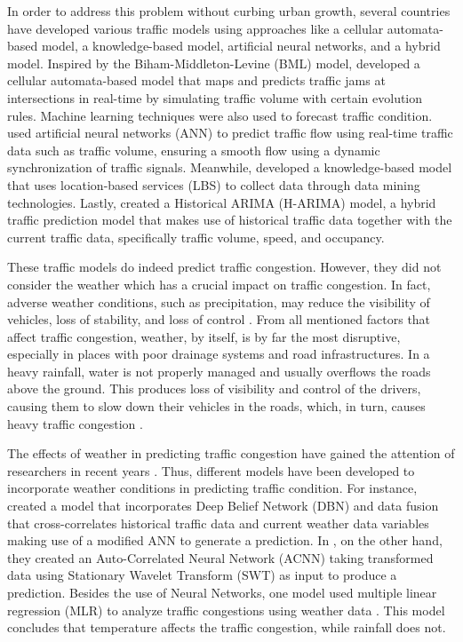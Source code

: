 In order to address this problem without curbing urban growth, several countries have developed various traffic models using approaches like a cellular automata-based model, a knowledge-based model, artificial neural networks, and a hybrid model. Inspired by the Biham-Middleton-Levine (BML) model,  developed a cellular automata-based model that maps and predicts traffic jams at intersections in real-time by simulating traffic volume with certain evolution rules. Machine learning techniques were also used to forecast traffic condition.  used artificial neural networks (ANN) to predict traffic flow using real-time traffic data such as traffic volume, ensuring a smooth flow using a dynamic synchronization of traffic signals. Meanwhile,  developed a knowledge-based model that uses location-based services (LBS) to collect data through data mining technologies. Lastly,  created a Historical ARIMA (H-ARIMA) model, a hybrid traffic prediction model that makes use of historical traffic data together with the current traffic data, specifically traffic volume, speed, and occupancy. 

These traffic models do indeed predict traffic congestion. However, they did not consider the weather which has a crucial impact on traffic congestion. In fact, adverse weather conditions, such as precipitation, may reduce the visibility of vehicles, loss of stability, and loss of control . From all mentioned factors that affect traffic congestion, weather, by itself, is by far the most disruptive, especially in places with poor drainage systems and road infrastructures. In a heavy rainfall, water is not properly managed and usually overflows the roads above the ground. This produces loss of visibility and control of the drivers, causing them to slow down their vehicles in the roads, which, in turn, causes heavy traffic congestion .

The effects of weather in predicting traffic congestion have gained the attention of researchers in recent years . Thus, different models have been developed to incorporate weather conditions in predicting traffic condition. For instance,  created a model that incorporates Deep Belief Network (DBN) and data fusion that cross-correlates historical traffic data and current weather data variables making use of a modified ANN to generate a prediction. In , on the other hand, they created an Auto-Correlated Neural Network (ACNN) taking transformed data using Stationary Wavelet Transform (SWT) as input to produce a prediction. Besides the use of Neural Networks, one model used multiple linear regression (MLR) to analyze traffic congestions using weather data . This model concludes that temperature affects the traffic congestion, while rainfall does not.


